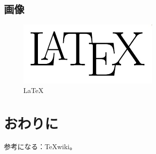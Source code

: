 \documentclass[uplatex]{jsarticle}
\begin{document}
\subsection{画像}
\begin{figure}[htp]
\begin{center}
 \includegraphics[width=7cm]{imgs/latex.jpg}
\end{center}
 \caption{\LaTeX}
 \label{fig:nof}
\end{figure}


\section{おわりに}
参考になる：\TeX wiki\cite{tw}。



\end{document}
